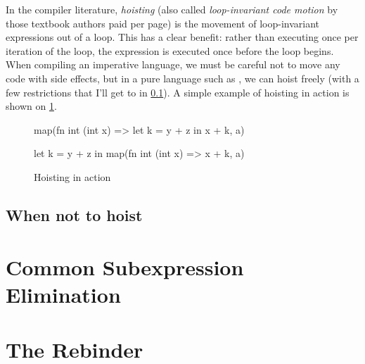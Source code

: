 In the compiler literature, \textit{hoisting} (also called
\textit{loop-invariant code motion} by those textbook authors paid per
page) is the movement of loop-invariant expressions out of a loop.
This has a clear benefit: rather than executing once per iteration of
the loop, the expression is executed once before the loop begins.
When compiling an imperative language, we must be careful not to move
any code with side effects, but in a pure language such as \LO{}, we
can hoist freely (with a few restrictions that I'll get to in
\cref{sec:when-not-to-hoist}).  A simple example of hoisting in action
is shown on \cref{fig:simple-hoisting}.

\begin{figure}
\begin{center}
\begin{bcolorcode}
map(fn int (int x) =>
      let k = y + z in
      x + k,
    a)
\end{bcolorcode}
\hspace{1cm}
%
\hspace{1cm}
\begin{bcolorcode}
let k = y + z in
map(fn int (int x) =>
      x + k,
    a)
\end{bcolorcode}
\end{center}

\caption{Hoisting in action}
\label{fig:simple-hoisting}
\end{figure}

\subsection{When not to hoist}
\label{sec:when-not-to-hoist}

\section{Common Subexpression Elimination}

\section{The Rebinder}
\label{sec:rebinder}

